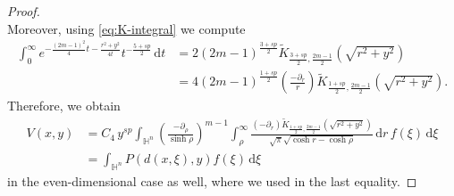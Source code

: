 \documentclass[11pt]{amsart}
\theoremstyle{plain}
\theoremstyle{definition}
\numberwithin{equation}{section}
\begin{document}
\begin{proof}
\begin{equation*}
\end{equation*}
Moreover, using \eqref{eq:K-integral} we compute
\begin{equation*}
\begin{split}
\int_{0}^{\infty} e^{-\frac{(2m-1)^2}{4} t-\frac{r^{2}+y^{2}}{4t}} t^{-\frac{5+sp}{2}} \, \mathrm{d}t
&= 2 (2m-1)^{\frac{3+sp}{2}} \widetilde{K}_{\frac{3+sp}{2}, \frac{2m-1}{2}}\left( \sqrt{r^{2}+y^{2}} \right) \\
&= 4(2m-1)^{\frac{1+sp}{2}} \left( \frac{-\partial_{r}}{r} \right) \widetilde{K}_{\frac{1+sp}{2}, \frac{2m-1}{2}} \left( \sqrt{r^{2}+y^{2}} \right).
\end{split}
\end{equation*}
Therefore, we obtain
\begin{equation*}
\begin{split}
V(x,y)
&= C_{4} \, y^{sp} \int_{\mathbb{H}^{n}} \left( \frac{-\partial_{\rho}}{\sinh \rho} \right)^{m-1} \int_{\rho}^{\infty} \frac{(-\partial_{r}) \widetilde{K}_{\frac{1+sp}{2}, \frac{2m-1}{2}}\left(\sqrt{r^{2}+y^{2}} \right)}{\sqrt{\pi}\sqrt{\cosh r-\cosh \rho}} \, \mathrm{d}r \,f(\xi) \, \mathrm{d}\xi \\
&= \int_{\mathbb{H}^{n}} P(d(x, \xi), y) f(\xi) \,\mathrm{d}\xi
\end{split}
\end{equation*}
in the even-dimensional case as well, where we used  in the last equality.


\end{proof}
\end{document}
